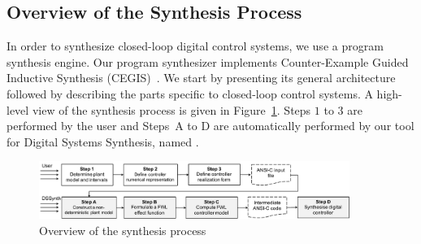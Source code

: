 \documentclass[final]{sig-alternate-05-2015}
\begin{document}
\subsection{Overview of the Synthesis Process}
\label{verification-flow}

In order to synthesize closed-loop digital control systems, we use a program
synthesis engine.  Our program synthesizer implements Counter-Example Guided
Inductive Synthesis (CEGIS)~\cite{sketch}.  We start by presenting its
general architecture followed by describing the parts specific to
closed-loop control systems.  A high-level view of the synthesis process is
given in Figure~\ref{DSSynth_process}.  Steps $1$ to $3$ are performed by
the user and Steps~A to D are automatically performed by our tool for
Digital Systems Synthesis, named \tool.
%

\begin{figure}[t]
\centering
\includegraphics[width=0.9\textwidth]{figures/synthesis-flow.pdf}
\vspace{0.1cm}
\caption{Overview of the synthesis process\label{DSSynth_process}}
\end{figure}

\end{document}

